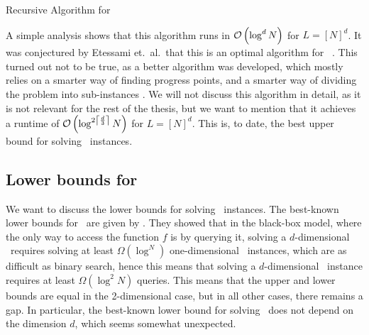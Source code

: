\begin{algorithm}
    \caption{Recursive Algorithm for \Tarski}
    \label{alg:recursive_tarski_solver}
\end{algorithm}

A simple analysis shows that this algorithm runs in $\mathcal{O}\left(\log^{d}{N}\right)$ for $L = [N]^d$. It was conjectured by Etessami et.\ al.\ that this is an optimal algorithm for \Tarski\ . This turned out not to be true, as a better algorithm was developed, which mostly relies on a smarter way of finding progress points, and a smarter way of dividing the problem into sub-instances . We will not discuss this algorithm in detail, as it is not relevant for the rest of the thesis, but we want to mention that it achieves a runtime of $\mathcal{O}\left(\log^{2\left\lceil\frac{d}{3}\right\rceil}{N}\right)$ for $L = [N]^d$. This is, to date, the best upper bound for solving \Tarski\ instances.

\subsection{Lower bounds for \Tarski}

We want to discuss the lower bounds for solving \Tarski\ instances. The best-known lower bounds for \Tarski\ are given by . They showed that in the black-box model, where the only way to access the function $f$ is by querying it, solving a $d$-dimensional \Tarski\ requires solving at least $\Omega(\log^{N})$ one-dimensional \Tarski\ instances, which are as difficult as binary search, hence this means that solving a $d$-dimensional \Tarski\ instance requires at least $\Omega(\log^{2}{N})$ queries. This means that the upper and lower bounds are equal in the 2-dimensional case, but in all other cases, there remains a gap. In particular, the best-known lower bound for solving \Tarski\ does not depend on the dimension $d$, which seems somewhat unexpected.

